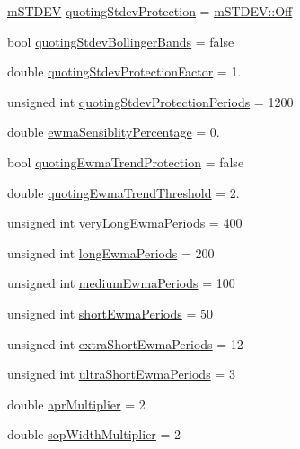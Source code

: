 \begin{DoxyCompactItemize}
\item 
\hyperlink{namespace_k_a648db17031757556a30a6ba51a9ce636}{m\+S\+T\+D\+EV} \hyperlink{struct_k_1_1m_quoting_params_ac799b2adc766e961b812d1a97d97063c}{quoting\+Stdev\+Protection} = \hyperlink{namespace_k_a89330b32d78089edeaa5bc6fe48d605dad15305d7a4e34e02489c74a5ef542f36}{m\+S\+T\+D\+E\+V\+::\+Off}
\item 
bool \hyperlink{struct_k_1_1m_quoting_params_aa0fa38752190501ff21345250e62a843}{quoting\+Stdev\+Bollinger\+Bands} = false
\item 
double \hyperlink{struct_k_1_1m_quoting_params_ac560879d917a01a352c44d54cc9cbadb}{quoting\+Stdev\+Protection\+Factor} = 1.
\item 
unsigned int \hyperlink{struct_k_1_1m_quoting_params_ad94d984ac4098971a3d44ce736edefb0}{quoting\+Stdev\+Protection\+Periods} = 1200
\item 
double \hyperlink{struct_k_1_1m_quoting_params_aa9c1573602f4339de74409d7a69de26f}{ewma\+Sensiblity\+Percentage} = 0.
\item 
bool \hyperlink{struct_k_1_1m_quoting_params_a61b6dfbdc7421efd1a7a7fa36c127ffb}{quoting\+Ewma\+Trend\+Protection} = false
\item 
double \hyperlink{struct_k_1_1m_quoting_params_a14356d95d1c4c6a1c0cfadd22ffbfe3e}{quoting\+Ewma\+Trend\+Threshold} = 2.
\item 
unsigned int \hyperlink{struct_k_1_1m_quoting_params_af296a51a25b34f662a36db31a4481702}{very\+Long\+Ewma\+Periods} = 400
\item 
unsigned int \hyperlink{struct_k_1_1m_quoting_params_a1f51ec10f77d37f7af33d3dc5161b440}{long\+Ewma\+Periods} = 200
\item 
unsigned int \hyperlink{struct_k_1_1m_quoting_params_af0d97776d733257c7f697f39d80962d9}{medium\+Ewma\+Periods} = 100
\item 
unsigned int \hyperlink{struct_k_1_1m_quoting_params_a65a5668435d92d42e7f593610c631d05}{short\+Ewma\+Periods} = 50
\item 
unsigned int \hyperlink{struct_k_1_1m_quoting_params_a9e3ade82ef85cb29dfb6f493b64df9f7}{extra\+Short\+Ewma\+Periods} = 12
\item 
unsigned int \hyperlink{struct_k_1_1m_quoting_params_a6eb0a78fa24178b92665467314fd1b1d}{ultra\+Short\+Ewma\+Periods} = 3
\item 
double \hyperlink{struct_k_1_1m_quoting_params_a66807d8fce3feefad4ba68f020d50bf5}{apr\+Multiplier} = 2
\item 
double \hyperlink{struct_k_1_1m_quoting_params_a48109b838d1faaf4dbe97fe214a6e266}{sop\+Width\+Multiplier} = 2

\end{DoxyCompactItemize}
